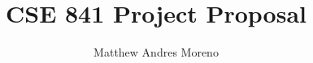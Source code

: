 \documentclass[12pt]{article}
\title{CSE 841 Project Proposal}
\author {Matthew Andres Moreno}
\theoremstyle{definition}
\begin{document}
\section*{\thetitle}













\end{document}
